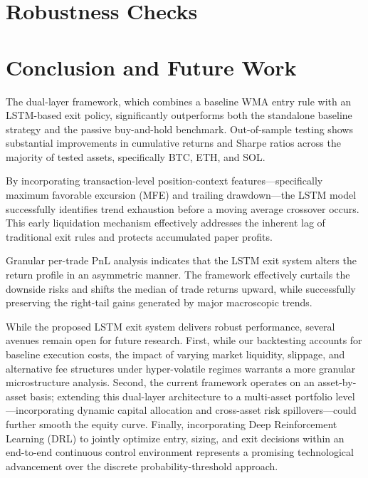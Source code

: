\documentclass[12pt]{article}
\begin{document}
\section{Robustness Checks}

\section{Conclusion and Future Work}

The dual-layer framework, which combines a baseline WMA entry rule with an LSTM-based exit policy, significantly outperforms both the standalone baseline strategy and the passive buy-and-hold benchmark. Out-of-sample testing shows substantial improvements in cumulative returns and Sharpe ratios across the majority of tested assets, specifically BTC, ETH, and SOL.

By incorporating transaction-level position-context features—specifically maximum favorable excursion (MFE) and trailing drawdown—the LSTM model successfully identifies trend exhaustion before a moving average crossover occurs. This early liquidation mechanism effectively addresses the inherent lag of traditional exit rules and protects accumulated paper profits.

Granular per-trade PnL analysis indicates that the LSTM exit system alters the return profile in an asymmetric manner. The framework effectively curtails the downside risks and shifts the median of trade returns upward, while successfully preserving the right-tail gains generated by major macroscopic trends.

While the proposed LSTM exit system delivers robust performance, several avenues remain open for future research. First, while our backtesting accounts for baseline execution costs, the impact of varying market liquidity, slippage, and alternative fee structures under hyper-volatile regimes warrants a more granular microstructure analysis. Second, the current framework operates on an asset-by-asset basis; extending this dual-layer architecture to a multi-asset portfolio level—incorporating dynamic capital allocation and cross-asset risk spillovers—could further smooth the equity curve. Finally, incorporating Deep Reinforcement Learning (DRL) to jointly optimize entry, sizing, and exit decisions within an end-to-end continuous control environment represents a promising technological advancement over the discrete probability-threshold approach.
\end{document}
